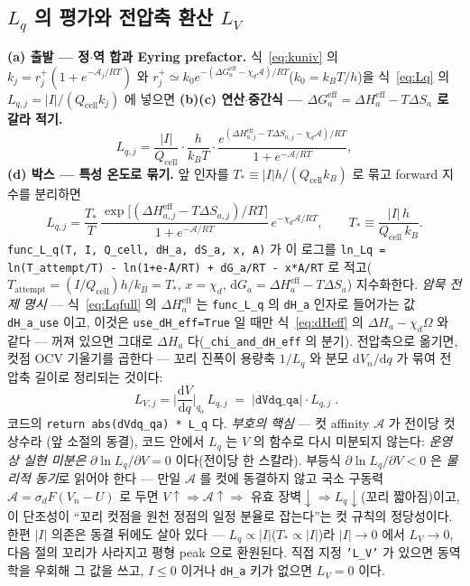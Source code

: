 \documentclass[11pt,a4paper]{article}
\newcommand{\dd}{\mathrm{d}}
\newcommand{\eff}{\mathrm{eff}}
\newcommand{\cell}{\mathrm{cell}}
\newcommand{\code}[1]{\texttt{#1}}
\begin{document}
\subsection{$L_q$ 의 평가와 전압축 환산 $L_V$}
\textbf{(a) 출발 — 정$\cdot$역 합과 Eyring prefactor.} 식~\eqref{eq:kuniv} 의 $k_j=r_j^+(1+e^{-\mathcal A_j/RT})$ 와
$r_j^+\simeq k_0e^{-(\Delta G_a^\eff-\chi_d\mathcal A)/RT}$($k_0=k_BT/h$)을 식~\eqref{eq:Lq} 의 $L_{q,j}=|I|/(Q_\cell k_j)$
에 넣으면 \textbf{(b)(c) 연산$\cdot$중간식 — $\Delta G_a^\eff=\Delta H_a^\eff-T\Delta S_a$ 로 갈라 적기.}
\begin{equation}
L_{q,j}=\frac{|I|}{Q_\cell}\cdot\frac{h}{k_BT}\cdot
\frac{e^{(\Delta H_{a,j}^\eff-T\Delta S_{a,j}-\chi_d\mathcal A)/RT}}{1+e^{-\mathcal A/RT}},
\label{eq:Lqmid2}
\end{equation}
\textbf{(d) 박스 — 특성 온도로 묶기.} 앞 인자를 $T_*\equiv|I|h/(Q_\cell k_B)$ 로 묶고 forward 지수를 분리하면
\begin{equation}
L_{q,j}=\frac{T_*}{T}\,\frac{\exp\!\big[(\Delta H_{a,j}^\eff-T\Delta S_{a,j})/RT\big]}{1+e^{-\mathcal A/RT}}
\,e^{-\chi_d\mathcal A/RT},
\qquad T_*\equiv\frac{|I|\,h}{Q_\cell\,k_B}.
\label{eq:Lqfull}
\end{equation}
\code{func\_L\_q(T, I, Q\_cell, dH\_a, dS\_a, x, A)} 가 이 로그를
\code{ln\_Lq = ln(T\_attempt/T) - ln(1+e\^{-A/RT}) + dG\_a/RT - x*A/RT} 로 적고($T_\mathrm{attempt}=(I/Q_\cell)h/k_B=T_*$,
$x=\chi_d$, $\dd G_a=\Delta H_a^\eff-T\Delta S_a$) 지수화한다. \emph{암묵 전제 명시} — 식~\eqref{eq:Lqfull} 의
$\Delta H_a^\eff$ 는 \code{func\_L\_q} 의 \code{dH\_a} 인자로 들어가는 값 \code{dH\_a\_use} 이고, 이것은
\code{use\_dH\_eff=True} 일 때만 식~\eqref{eq:dHeff} 의 $\Delta H_a-\chi_d\Omega$ 와 같다 — 꺼져 있으면 그대로
$\Delta H_a$ 다(\code{\_chi\_and\_dH\_eff} 의 분기). 전압축으로 옮기면, 컷점 OCV 기울기를 곱한다 — 꼬리 진폭이
용량축 $1/L_q$ 와 분모 $\dd V_n/\dd q$ 가 묶여 전압축 길이로 정리되는 것이다:
\begin{equation}
\boxed{\;L_{V,j}=\Big|\frac{\dd V}{\dd q}\Big|_{q_a}\,L_{q,j}\;=\;|\code{dVdq\_qa}|\cdot L_{q,j}\;.}
\label{eq:LV}
\end{equation}
코드의 \code{return abs(dVdq\_qa) * L\_q} 다. \emph{부호의 핵심} — 컷 affinity $\mathcal A$ 가 전이당 컷 상수라
(앞 소절의 동결), 코드 안에서 $L_q$ 는 $V$ 의 함수로 다시 미분되지 않는다: \emph{운영상 실현 미분은}
$\partial\ln L_q/\partial V=0$ 이다(전이당 한 스칼라). 부등식 $\partial\ln L_q/\partial V<0$ 은 \emph{물리적 동기}로 읽어야
한다 — 만일 $\mathcal A$ 를 컷에 동결하지 않고 국소 구동력 $\mathcal A=\sigma_dF(V_n-U)$ 로 두면 $V\!\uparrow\Rightarrow
\mathcal A\!\uparrow\Rightarrow$ 유효 장벽$\downarrow\Rightarrow L_q\downarrow$(꼬리 짧아짐)이고, 이 단조성이 ``꼬리 컷점을
원천 정점의 일정 분율로 잡는다''는 컷 규칙의 정당성이다. 한편 $|I|$ 의존은 동결 뒤에도 살아 있다 — $L_q\propto|I|$($T_*\propto|I|$)라 $|I|\to0$
에서 $L_V\to0$, 다음 절의 꼬리가 사라지고 평형 peak 으로 환원된다. 직접 지정 \code{'L\_V'} 가 있으면 동역학을 우회해
그 값을 쓰고, $I\le0$ 이거나 \code{dH\_a} 키가 없으면 $L_V=0$ 이다.
\end{document}
